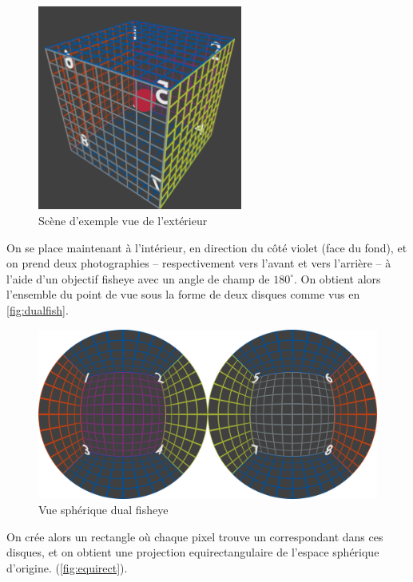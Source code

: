 			\begin{figure}[h]
			{
				\centering
				\includegraphics[width=0.6\textwidth]{figures/cage.png}
				\caption{Scène d'exemple vue de l'extérieur}
				\label{fig:cage}
			}
			\end{figure}
			\par
			On se place maintenant à l'intérieur, en direction du côté violet (face du fond), et on prend deux photographies -- respectivement vers l'avant et vers l'arrière -- à l'aide d'un objectif \gls{fisheye} avec un angle de champ de $180^{\circ}$. On obtient alors l'ensemble du point de vue sous la forme de deux disques comme vus en \autoref{fig:dualfish}.
			\begin{figure}[H]
			{
				\centering
				\includegraphics[width=1\textwidth]{figures/dfish.png}
				\caption{Vue sphérique \og dual fisheye \fg{}}
				\label{fig:dualfish}
			}
			\end{figure}
			\par
			On crée alors un rectangle où chaque pixel trouve un correspondant dans ces disques, et on obtient une projection equirectangulaire de l'espace sphérique d'origine. (\autoref{fig:equirect}).
